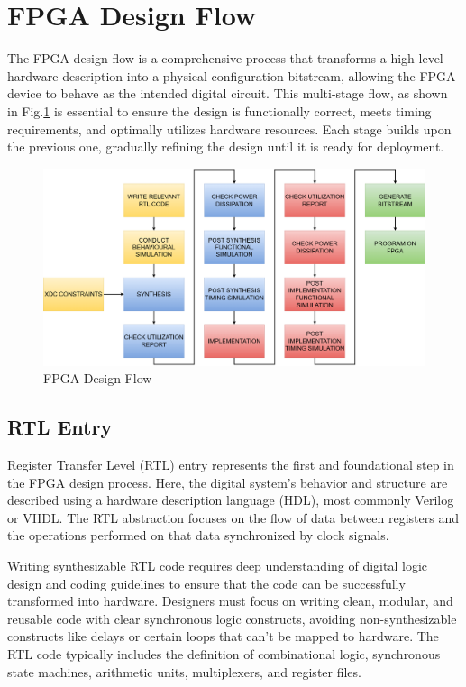 
\section{FPGA Design Flow}
The FPGA design flow is a comprehensive process that transforms a high-level hardware description into a physical configuration bitstream, allowing the FPGA device to behave as the intended digital circuit. This multi-stage flow, as shown in Fig.\ref{fig:fpga-design-flow} is essential to ensure the design is functionally correct, meets timing requirements, and optimally utilizes hardware resources. Each stage builds upon the previous one, gradually refining the design until it is ready for deployment.

\begin{figure}[H]
	\centerline{\includegraphics[scale = 0.2]{Figures/FPGA_design_flow_v2.png}}
	\caption{FPGA Design Flow}
	\label{fig:fpga-design-flow}
\end{figure}

\subsection{RTL Entry}
Register Transfer Level (RTL) entry represents the first and foundational step in the FPGA design process. Here, the digital system's behavior and structure are described using a hardware description language (HDL), most commonly Verilog or VHDL. The RTL abstraction focuses on the flow of data between registers and the operations performed on that data synchronized by clock signals.

Writing synthesizable RTL code requires deep understanding of digital logic design and coding guidelines to ensure that the code can be successfully transformed into hardware. Designers must focus on writing clean, modular, and reusable code with clear synchronous logic constructs, avoiding non-synthesizable constructs like delays or certain loops that can't be mapped to hardware. The RTL code typically includes the definition of combinational logic, synchronous state machines, arithmetic units, multiplexers, and register files.

